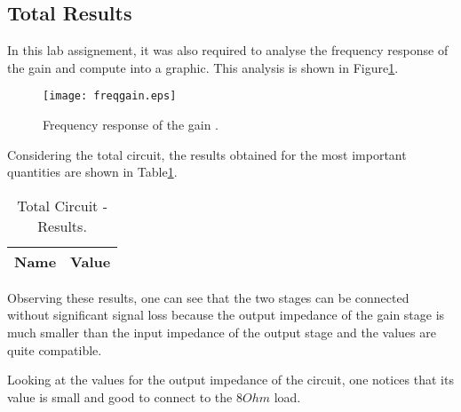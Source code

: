 \newpage

\subsection{Total Results}

\par In this lab assignement, it was also required to analyse the frequency response of the gain and compute into a graphic. This analysis is shown in Figure\ref{fig:freqresp}.

\begin{figure}[h] \centering
\texttt{[image: freqgain.eps]}
\caption{Frequency response of the gain .}
\label{fig:freqresp}
\end{figure}


\par Considering the total circuit, the results obtained for the most important quantities are shown in Table\ref{tab:totalrmat}.

\begin{table}[h]
  \centering
  \begin{tabular}{|l|r|}
    \hline    
    {\bf Name} & {\bf Value}\\ \hline
    
  \end{tabular}
  \caption{Total Circuit - Results.}
  \label{tab:totalrmat}
\end{table}


\par Observing these results, one can see that the two stages can be connected without significant signal loss because the output impedance of the gain stage is much smaller than the input impedance of the output stage and the values are quite compatible.

\par Looking at the values for the output impedance of the circuit, one notices that its value is small and good to connect to the $8 Ohm$ load.

\newpage
